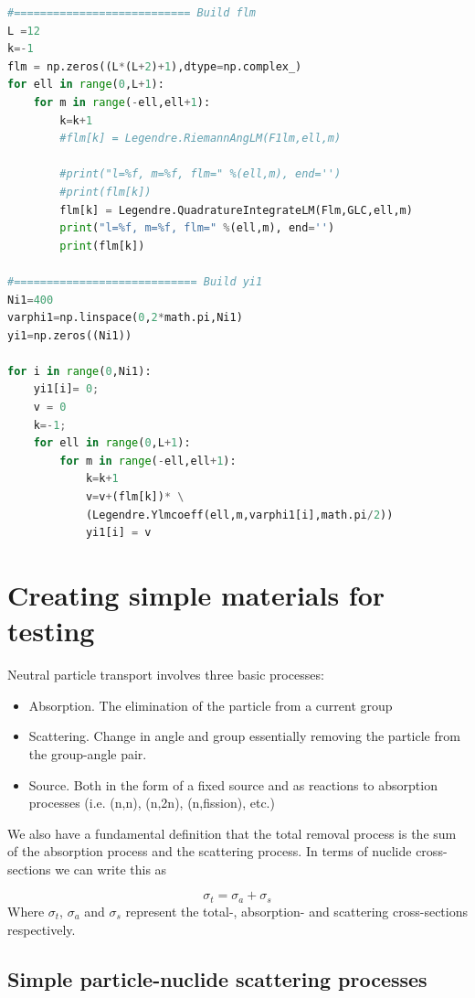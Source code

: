 \documentclass[11pt,letterpaper,titlepage]{article}
\renewcommand{\thefigure}{\arabic{section}.\arabic{figure}}
\numberwithin{equation}{section}
\begin{document}
\begin{appendices}
\begin{lstlisting}[language=python]
#=========================== Build flm
L =12
k=-1
flm = np.zeros((L*(L+2)+1),dtype=np.complex_)
for ell in range(0,L+1):
    for m in range(-ell,ell+1):
        k=k+1
        #flm[k] = Legendre.RiemannAngLM(F1lm,ell,m)
        
        #print("l=%f, m=%f, flm=" %(ell,m), end='')
        #print(flm[k])
        flm[k] = Legendre.QuadratureIntegrateLM(Flm,GLC,ell,m)
        print("l=%f, m=%f, flm=" %(ell,m), end='')
        print(flm[k])

#============================ Build yi1
Ni1=400
varphi1=np.linspace(0,2*math.pi,Ni1)
yi1=np.zeros((Ni1))

for i in range(0,Ni1):
    yi1[i]= 0;
    v = 0
    k=-1;
    for ell in range(0,L+1):
        for m in range(-ell,ell+1):
            k=k+1
            v=v+(flm[k])* \
            (Legendre.Ylmcoeff(ell,m,varphi1[i],math.pi/2))
            yi1[i] = v
\end{lstlisting}



\newpage 
\renewcommand{\thefigure}{C.\arabic{figure}}
\section{Creating simple materials for testing}
Neutral particle transport involves three basic processes:
\begin{itemize}
\item Absorption. The elimination of the particle from a current group
\item Scattering. Change in angle and group essentially removing the particle from the group-angle pair.
\item Source. Both in the form of a fixed source and as reactions to absorption processes (i.e. (n,n), (n,2n), (n,fission), etc.)
\end{itemize}

We also have a fundamental definition that the total removal process is the sum of the absorption process and the scattering process. In terms of nuclide cross-sections we can write this as

$$
\sigma_t = \sigma_a + \sigma_s 
$$
Where $\sigma_t$, $\sigma_a$ and $\sigma_s$ represent the total-, absorption- and scattering cross-sections respectively.

\subsection{Simple particle-nuclide scattering processes}


\end{appendices}
\end{document}
